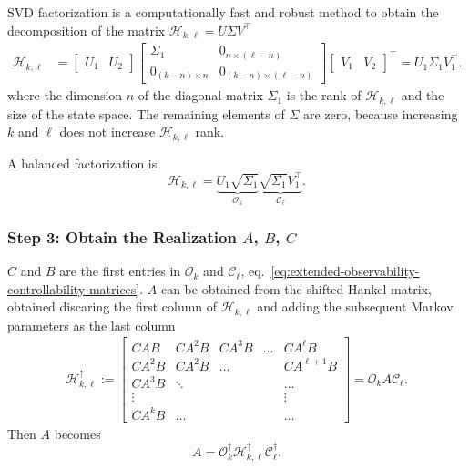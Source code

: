 SVD factorization is a computationally fast and robust method to obtain the decomposition of the matrix $\mathcal{H}_{k,\ell} = U \Sigma V^\top$
\begin{align*}
  \mathcal{H}_{k,\ell} &=
                \begin{bmatrix}
                  U_1 & U_2
                \end{bmatrix}
                \begin{bmatrix}
                  \Sigma_1 & 0_{n \times (\ell-n)} \\
                  0_{(k-n)\times n} & 0_{(k-n)\times (\ell-n)}
                \end{bmatrix}
                \begin{bmatrix}
                  V_1 & V_2
                \end{bmatrix}^\top = U_1 \Sigma_1 V_1^\top.
\end{align*}
where the dimension $n$ of the diagonal matrix $\Sigma_1$ is the rank of $\mathcal{H}_{k,\ell}$ and the size of the state space. The remaining elements of $\Sigma$ are zero, because increasing $k$ and $\ell$ does not increase $\mathcal{H}_{k,\ell}$ rank.

A balanced factorization is
\begin{equation*}
  \mathcal{H}_{k,\ell} = \underbrace{U_1\sqrt{\Sigma_1}}_{\mathcal{O}_k} \underbrace{\sqrt{\Sigma_1}V_1^\top}_{\mathcal{C}_\ell}.
\end{equation*}

\subsubsection{Step 3: Obtain the Realization $A$, $B$, $C$}
\label{sec:obtain-system-realization}

$C$ and $B$ are the first entries in $\mathcal{O}_k$ and $\mathcal{C}_\ell$, eq.~\eqref{eq:extended-observability-controllability-matrices}. $A$ can be obtained from the shifted Hankel matrix, obtained discaring the first column of $\mathcal{H}_{k,\ell}$ and adding the subsequent Markov parameters as the last column
\begin{align*}
  \mathcal{H}_{k,\ell}^\uparrow :=
  \begin{bmatrix}
    CAB & CA^2B & CA^3 B & \ldots & CA^\ell B \\
    CA^2B & CA^2B & \ldots & & CA^{\ell+1}B \\
    CA^3B & \ddots & & & \ldots \\
    \vdots & & & & \vdots \\
    CA^kB & \ldots & & & \ldots
  \end{bmatrix} = \mathcal{O}_k A \mathcal{C}_\ell.
\end{align*}
Then $A$ becomes
\begin{equation*}
  A = \mathcal{O}_k^\dagger\mathcal{H}_{k,\ell}^\uparrow \mathcal{C}_\ell^\dagger.
\end{equation*}



